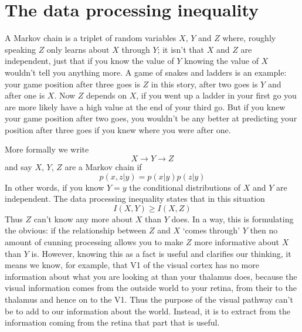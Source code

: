 \documentclass[12pt]{article}
\begin{document}
\section*{The data processing inequality}

A Markov chain is a triplet of random variables $X$, $Y$ and $Z$
where, roughly speaking $Z$ only learns about $X$ through $Y$; it isn't
that $X$ and $Z$ are independent, just that if you know the value of
$Y$ knowing the value of $X$ wouldn't tell you anything more. A game of
snakes and ladders is an example: your game position after three goes
is $Z$ in this story, after two goes is $Y$ and after one is $X$. Now
$Z$ depends on $X$, if you went up a ladder in your first go you are
more likely have a high value at the end of your third go. But if you
knew your game position after two goes, you wouldn't be any better at
predicting your position after three goes if you knew where you were
after one.

More formally we write
\begin{equation}
X\rightarrow Y \rightarrow Z
\end{equation}
and say $X$, $Y$, $Z$ are a Markov chain if
\begin{equation}
p(x,z|y)=p(x|y)p(z|y)
\end{equation}
In other words, if you know $Y=y$ the conditional distributions of $X$
and $Y$ are independent. The data processing inequality states that in
this situation
\begin{equation}
I(X,Y)\ge I(X,Z)
\end{equation}
Thus $Z$ can't know any more about $X$ than $Y$ does. In a way, this
is formulating the obvious: if the relationship between $Z$ and $X$
\lq{}comes through\rq{} $Y$ then no amount of cunning processing
allows you to make $Z$ more informative about $X$ than $Y$
is. However, knowing this as a fact is useful and clarifies our
thinking, it means we know, for example, that V1 of the visual cortex
has no more information about what you are looking at than your
thalamus does, because the visual information comes from the outside
world to your retina, from their to the thalamus and hence on to the
V1. Thus the purpose of the visual pathway can't be to add to our
information about the world. Instead, it is to extract from the
information coming from the retina that part that is useful.


{}
\end{document}
